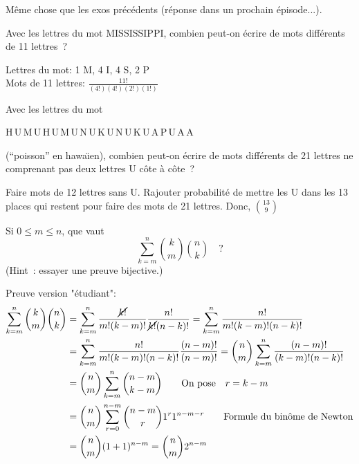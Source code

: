 Même chose que les exos précédents (réponse dans un prochain épisode...).


\begin{exo} 
Avec les lettres du mot MISSISSIPPI, combien peut-on \'ecrire de mots diff\'erents de 11 lettres~?
\end{exo}

Lettres du mot: 1 M, 4 I, 4 S, 2 P \\

Mots de 11 lettres: $ \frac{11!}{(4!)(4!)(2!)(1!)}$


\begin{exo} 
Avec les lettres du mot 
%
\begin{center}
H\,U\,M\,U\,H\,U\,M\,U\,N\,U\,K\,U\,N\,U\,K\,U\,A\,P\,U\,A\,A
\end{center}
(``poisson'' en hawa\"\i{}en), combien peut-on \'ecrire de mots diff\'erents de 21 lettres ne comprenant pas deux lettres U c\^ote \`a c\^ote~?
\end{exo}

Faire mots de 12 lettres sans U. Rajouter probabilité de mettre les U dans les 13 places qui restent pour faire des mots de 21 lettres. Donc, ${13 \choose 9}$


\begin{exo} 
Si $0 \leqslant m \leqslant n$, que vaut
$$
\sum_{k=m}^n {k \choose m}{n \choose k}\quad ?
$$
(Hint~: essayer une preuve bijective.)
\end{exo}

Preuve version "étudiant": \\

\begin{align*}
 \sum_{k=m}^n {k \choose m}{n \choose k} &= \sum_{k=m}^n \frac{\cancel{k!}}{m!(k-m)!} \frac{n!}{\cancel{k!}(n-k)!} = \sum_{k=m}^n \frac{n!}{m!(k-m)!(n-k)!} \\
 &= \sum_{k=m}^n \frac{n!}{m!(k-m)!(n-k)!} \frac{(n-m)!}{(n-m)!} = {n \choose m} \sum_{k=m}^n \frac{(n-m)!}{(k-m)!(n-k)!} \\
 &= {n \choose m} \sum_{k=m}^n {n-m \choose k-m} \vspace{1cm} \qquad \text{On pose} \quad r=k-m \\
 &= {n \choose m} \sum_{r=0}^{n-m} {n-m \choose r} 1^{r} 1^{n-m-r} \qquad \text{Formule du binôme de Newton} \\
 &= {n \choose m} (1+1)^{n-m} = {n \choose m} 2^{n-m} \\
\end{align*}

